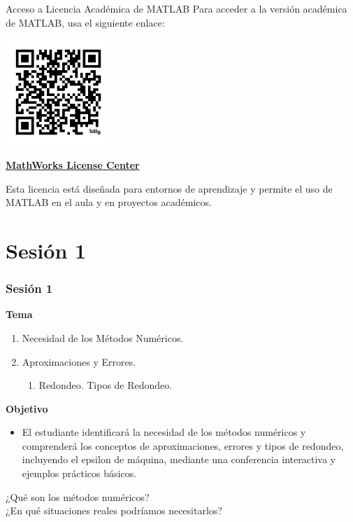 \documentclass{beamer}
\begin{document}
\begin{frame}{Acceso a Licencia Académica de MATLAB}
    \centering
    Para acceder a la versión académica de MATLAB, usa el siguiente enlace:  
    \vspace{0.5cm}
    \begin{center}
\includegraphics[width=4cm]{images/matlab_license.png}
    \end{center}
    \Large \textbf{\href{https://www.mathworks.com/licensecenter/classroom/laff/}{MathWorks License Center}}  
    
    \vspace{0.5cm}
    
    Esta licencia está diseñada para entornos de aprendizaje y permite el uso de MATLAB en el aula y en proyectos académicos.
\end{frame}

\section{Sesión 1}
\begin{frame}
\frametitle{Sesión 1}

\textbf{Tema}
\begin{enumerate}
\item Necesidad de los Métodos Numéricos.
\item Aproximaciones y Errores.
\begin{enumerate}
\item Redondeo. Tipos de Redondeo.
\end{enumerate}
\end{enumerate}
\textbf{Objetivo}
\begin{itemize}
    \item El estudiante identificará la necesidad de los métodos numéricos y comprenderá los conceptos de aproximaciones, errores y tipos de redondeo, incluyendo el epsilon de máquina, mediante una conferencia interactiva y ejemplos prácticos básicos.
\end{itemize}
\end{frame}

\begin{frame}
    \centering
    \Large ¿Qué son los métodos numéricos?
    \\[1cm]
    ¿En qué situaciones reales podríamos necesitarlos?
\end{frame}
\end{document}
